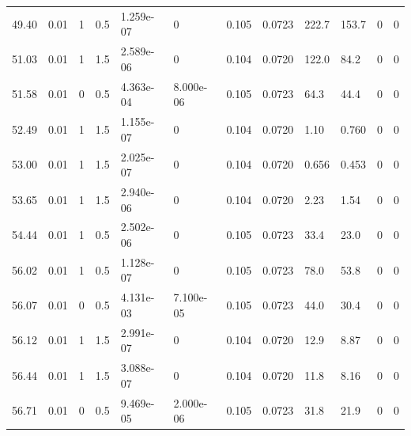 \documentclass[preview]{standalone}
\begin{document}
{{{\begin{tabular}{L{1.2cm}C{1.2cm} C{0.3cm}C{0.5cm} C{1.4cm}C{1.4cm} C{1.4cm}C{1.4cm} C{1.6cm}C{1.6cm} C{1.6cm}C{1.6cm}}
  49.40  &  0.01  & 1     & 0.5 &  1.259e-07  & 0  &  0.105&   0.0723& 222.7 & 153.7   &  0 & 0  \\ 
  51.03  &  0.01  & 1     & 1.5 &  2.589e-06  & 0  &  0.104&   0.0720& 122.0 & 84.2   &  0 & 0  \\ 
  51.58  &  0.01  & 0     & 0.5 &  4.363e-04  & 8.000e-06  &  0.105&   0.0723& 64.3 & 44.4   &  0 & 0  \\ 
  52.49  &  0.01  & 1     & 1.5 &  1.155e-07  & 0  &  0.104&   0.0720& 1.10 & 0.760   &  0 & 0  \\ 
  53.00  &  0.01  & 1     & 1.5 &  2.025e-07  & 0  &  0.104&   0.0720& 0.656 & 0.453   &  0 & 0  \\ 
  53.65  &  0.01  & 1     & 1.5 &  2.940e-06  & 0  &  0.104&   0.0720& 2.23 & 1.54   &  0 & 0  \\ 
  54.44  &  0.01  & 1     & 0.5 &  2.502e-06  & 0  &  0.105&   0.0723& 33.4 & 23.0   &  0 & 0  \\ 
  56.02  &  0.01  & 1     & 0.5 &  1.128e-07  & 0  &  0.105&   0.0723& 78.0 & 53.8   &  0 & 0  \\ 
  56.07  &  0.01  & 0     & 0.5 &  4.131e-03  & 7.100e-05  &  0.105&   0.0723& 44.0 & 30.4   &  0 & 0  \\ 
  56.12  &  0.01  & 1     & 1.5 &  2.991e-07  & 0  &  0.104&   0.0720& 12.9 & 8.87   &  0 & 0  \\ 
  56.44  &  0.01  & 1     & 1.5 &  3.088e-07  & 0  &  0.104&   0.0720& 11.8 & 8.16   &  0 & 0  \\ 
  56.71  &  0.01  & 0     & 0.5 &  9.469e-05  & 2.000e-06  &  0.105&   0.0723& 31.8 & 21.9   &  0 & 0  \\ 
\hline 
\end{tabular} 

}}}
\end{document}
